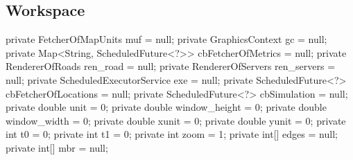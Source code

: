 \subsection{Workspace}
\nwenddocs{}\plusendmoddef
private FetcherOfMapUnits muf = null;
private GraphicsContext gc = null;
private Map<String, ScheduledFuture<?>> cbFetcherOfMetrics = null;
private RendererOfRoads ren_road = null;
private RendererOfServers ren_servers = null;
private ScheduledExecutorService exe = null;
private ScheduledFuture<?> cbFetcherOfLocations = null;
private ScheduledFuture<?> cbSimulation = null;
private double unit = 0;
private double window_height = 0;
private double window_width = 0;
private double xunit = 0;
private double yunit = 0;
private int t0 = 0;
private int t1 = 0;
private int zoom = 1;
private int[] edges = null;
private int[] mbr = null;
\nwendcode{}\nwdocspar

